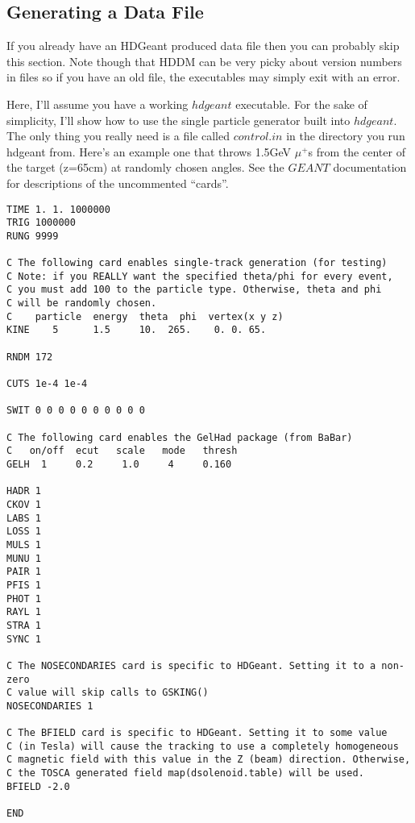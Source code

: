 \documentclass[12pt]{article}
\begin{document}
\subsection{Generating a Data File}
If you already have an HDGeant produced data file then you can 
probably skip this section. Note though that HDDM can be very
picky about version numbers in files so if you have an old file,
the executables may simply exit with an error.

Here, I'll assume you have a working $hdgeant$ executable.
For the sake of simplicity, I'll show how to use the 
single particle generator built into $hdgeant$. The only thing
you really need is a file called $control.in$ in the directory
you run hdgeant from. Here's an example one that throws 1.5GeV
$\mu^{+}$s from the center of the target (z=65cm) at randomly
chosen angles. See the $GEANT$ documentation for descriptions
of the uncommented ``cards''.

\begin{lstlisting}[caption=control.in,frame=shadowbox,backgroundcolor=\color{codebkgd}]
TIME 1. 1. 1000000
TRIG 1000000
RUNG 9999

C The following card enables single-track generation (for testing)
C Note: if you REALLY want the specified theta/phi for every event,
C you must add 100 to the particle type. Otherwise, theta and phi
C will be randomly chosen.
C    particle  energy  theta  phi  vertex(x y z)
KINE    5      1.5     10.  265.    0. 0. 65.

RNDM 172

CUTS 1e-4 1e-4

SWIT 0 0 0 0 0 0 0 0 0 0

C The following card enables the GelHad package (from BaBar)
C   on/off  ecut   scale   mode   thresh
GELH  1     0.2     1.0     4     0.160

HADR 1
CKOV 1
LABS 1
LOSS 1
MULS 1
MUNU 1
PAIR 1
PFIS 1
PHOT 1
RAYL 1
STRA 1
SYNC 1

C The NOSECONDARIES card is specific to HDGeant. Setting it to a non-zero
C value will skip calls to GSKING()
NOSECONDARIES 1

C The BFIELD card is specific to HDGeant. Setting it to some value
C (in Tesla) will cause the tracking to use a completely homogeneous
C magnetic field with this value in the Z (beam) direction. Otherwise,
C the TOSCA generated field map(dsolenoid.table) will be used.
BFIELD -2.0

END
\end{lstlisting}
\end{document}
